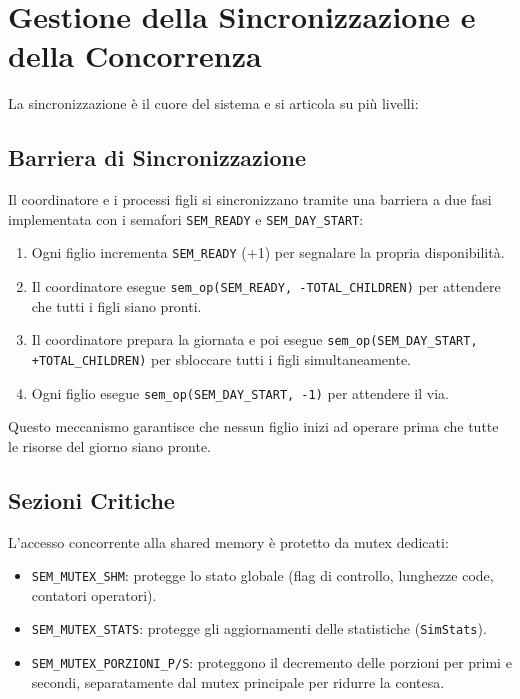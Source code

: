 \documentclass[a4paper,12pt]{article}
\begin{document}
\section{Gestione della Sincronizzazione e della Concorrenza}

La sincronizzazione è il cuore del sistema e si articola su più livelli:

\subsection{Barriera di Sincronizzazione}

Il coordinatore e i processi figli si sincronizzano tramite una barriera
a due fasi implementata con i semafori \texttt{SEM\_READY} e
\texttt{SEM\_DAY\_START}:

\begin{enumerate}
  \item Ogni figlio incrementa \texttt{SEM\_READY} (+1) per segnalare
        la propria disponibilità.
  \item Il coordinatore esegue
        \texttt{sem\_op(SEM\_READY, -TOTAL\_CHILDREN)} per attendere
        che tutti i figli siano pronti.
  \item Il coordinatore prepara la giornata e poi esegue
        \texttt{sem\_op(SEM\_DAY\_START, +TOTAL\_CHILDREN)} per
        sbloccare tutti i figli simultaneamente.
  \item Ogni figlio esegue \texttt{sem\_op(SEM\_DAY\_START, -1)}
        per attendere il via.
\end{enumerate}

Questo meccanismo garantisce che nessun figlio inizi ad operare
prima che tutte le risorse del giorno siano pronte.

\subsection{Sezioni Critiche}

L'accesso concorrente alla shared memory è protetto da mutex
dedicati:

\begin{itemize}
  \item \texttt{SEM\_MUTEX\_SHM}: protegge lo stato globale
        (flag di controllo, lunghezze code, contatori operatori).
  \item \texttt{SEM\_MUTEX\_STATS}: protegge gli aggiornamenti
        delle statistiche (\texttt{SimStats}).
  \item \texttt{SEM\_MUTEX\_PORZIONI\_P/S}: proteggono il
        decremento delle porzioni per primi e secondi,
        separatamente dal mutex principale per ridurre
        la contesa.
\end{itemize}
\end{document}
